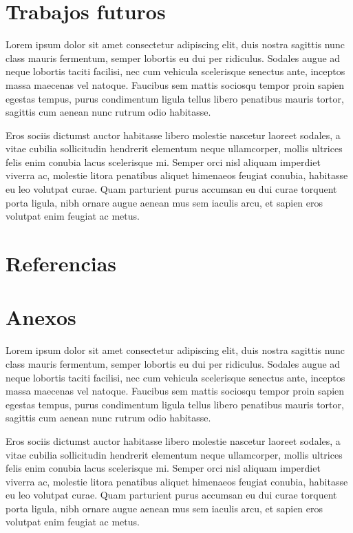 \documentclass{article}
\begin{document}
\newpage

\section{Trabajos futuros}
Lorem ipsum dolor sit amet consectetur adipiscing elit, duis nostra sagittis nunc class mauris fermentum, semper lobortis eu dui per ridiculus. Sodales augue ad neque lobortis taciti facilisi, nec cum vehicula scelerisque senectus ante, inceptos massa maecenas vel natoque. Faucibus sem mattis sociosqu tempor proin sapien egestas tempus, purus condimentum ligula tellus libero penatibus mauris tortor, sagittis cum aenean nunc rutrum odio habitasse.

Eros sociis dictumst auctor habitasse libero molestie nascetur laoreet sodales, a vitae cubilia sollicitudin hendrerit elementum neque ullamcorper, mollis ultrices felis enim conubia lacus scelerisque mi. Semper orci nisl aliquam imperdiet viverra ac, molestie litora penatibus aliquet himenaeos feugiat conubia, habitasse eu leo volutpat curae. Quam parturient purus accumsan eu dui curae torquent porta ligula, nibh ornare augue aenean mus sem iaculis arcu, et sapien eros volutpat enim feugiat ac metus.
\newpage

\section{Referencias}
\printbibliography

\newpage

\section{Anexos}
Lorem ipsum dolor sit amet consectetur adipiscing elit, duis nostra sagittis nunc class mauris fermentum, semper lobortis eu dui per ridiculus. Sodales augue ad neque lobortis taciti facilisi, nec cum vehicula scelerisque senectus ante, inceptos massa maecenas vel natoque. Faucibus sem mattis sociosqu tempor proin sapien egestas tempus, purus condimentum ligula tellus libero penatibus mauris tortor, sagittis cum aenean nunc rutrum odio habitasse.

Eros sociis dictumst auctor habitasse libero molestie nascetur laoreet sodales, a vitae cubilia sollicitudin hendrerit elementum neque ullamcorper, mollis ultrices felis enim conubia lacus scelerisque mi. Semper orci nisl aliquam imperdiet viverra ac, molestie litora penatibus aliquet himenaeos feugiat conubia, habitasse eu leo volutpat curae. Quam parturient purus accumsan eu dui curae torquent porta ligula, nibh ornare augue aenean mus sem iaculis arcu, et sapien eros volutpat enim feugiat ac metus.
\end{document}
